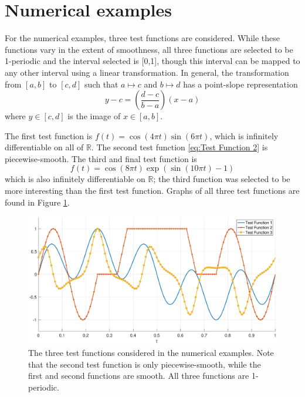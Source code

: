\documentclass[12pt]{article}
\begin{document}
\section{Numerical examples} \label{sec:Numerical examples}

For the numerical examples, three test functions are considered. While these functions vary in the extent of smoothness, all three functions are selected to be 1-periodic and the interval selected is [0,1], though this interval can be mapped to any other interval using a linear transformation. In general, the transformation from $[a,b]$ to $[c,d]$ such that $a \mapsto c$ and $b \mapsto d$ has a point-slope representation
\[y - c = \left(\frac{d-c}{b-a}\right)(x - a)\]
where $y \in [c,d]$ is the image of $x \in [a,b]$. \par
The first test function is $f(t) = \cos(4\pi{t})\sin(6\pi{t})$, which is infinitely differentiable on all of $\mathbb{R}$. The second test function \eqref{eq:Test Function 2} is piecewise-smooth. The third and final test function is
\begin{equation}
f(t) = \cos(8\pi{t})\exp(\sin(10\pi{t})-1)
\label{eq:Test Function 3}
\end{equation}
which is also infinitely differentiable on $\mathbb{R}$; the third function was selected to be more interesting than the first test function. Graphs of all three test functions are found in Figure \ref{TestFunctions}.  \par

\begin{figure}
	\centerline{\includegraphics[scale = 0.45]{Figures/TestFunctions1D.eps}}
\caption{The three test functions considered in the numerical examples. Note that the second test function is only piecewise-smooth, while the first and second functions are smooth. All three functions are 1-periodic.}
\label{TestFunctions}
\end{figure}
\end{document}
